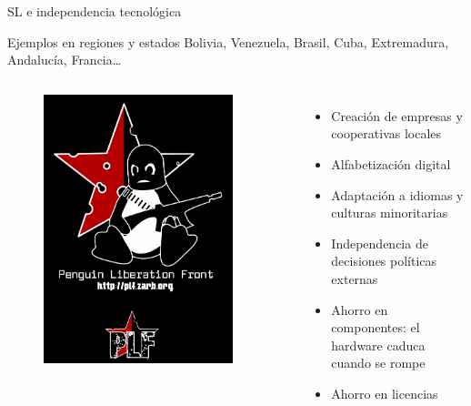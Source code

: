 \documentclass{beamer}
\begin{document}
\begin{frame}{SL e independencia tecnológica}
  \begin{exampleblock}{Ejemplos en regiones y estados}
    Bolivia, Venezuela, Brasil, Cuba, Extremadura, Andalucía,         Francia\ldots
  \end{exampleblock}
  
  \begin{columns}
    \begin{figure}
      \centering
      \includegraphics[width=0.9\textwidth]{pics/plf-orig.png}
    \end{figure}

    \pause
    \begin{itemize}[<+->]
    \item Creación de empresas y cooperativas locales
    \item Alfabetización digital
    \item Adaptación a idiomas y culturas minoritarias
    \item Independencia de decisiones políticas externas
    \item Ahorro en componentes: el hardware caduca cuando se rompe%
    \item Ahorro en licencias 
    \end{itemize}   \end{columns}
\end{frame}
\end{document}
